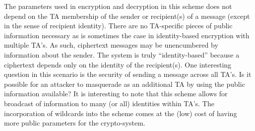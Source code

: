 \documentclass[10pt]{article}
\begin{document}
The parameters used in encryption and decryption in this scheme does not depend on the TA membership of the sender or recipient(s) of a message (except in the sense of recipient identity). There are no TA-specific pieces of public information necessary as is sometimes the case in identity-based encryption with multiple TA’s. As such, ciphertext messages may be unencumbered by information about the sender. The system is truly “identity-based” because a ciphertext depends only on the identity of the recipient(s). 
One interesting question in this scenario is the security of sending a message across all TA’s. Is it possible for an attacker to masquerade as an additional TA by using the public information available?
It is interesting to note that this scheme allows for broadcast of information to many (or all) identities within TA’s. The incorporation of wildcards into the scheme comes at the (low) cost of having more public parameters for the crypto-system.
\end{document}
